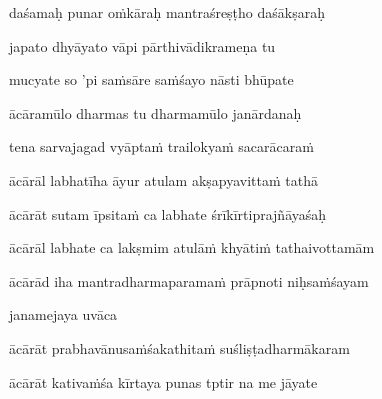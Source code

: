 daśamaḥ punar oṁkāraḥ mantraśreṣṭho daśākṣaraḥ\thinspace{\dandab} \dontdisplaylinenum

japato dhyāyato vāpi pārthivādikrameṇa tu \danda\dontdisplaylinenum

mucyate so 'pi saṁsāre saṁśayo nāsti bhūpate \veg\dontdisplaylinenum



ācāramūlo dharmas tu dharmamūlo janārdanaḥ\thinspace{\dandab} \dontdisplaylinenum

tena sarvajagad vyāptaṁ trailokyaṁ sacarācaraṁ \veg\dontdisplaylinenum

\ujvers\nemsloka 
ācārāl labhatīha āyur atulam akṣapyavittaṁ tathā
\dontdisplaylinenum

\nemslokab 
ācārāt sutam īpsitaṁ ca labhate śrīkīrtiprajñāyaśaḥ \danda\dontdisplaylinenum

\nemslokac 
ācārāl labhate ca lakṣmim atulāṁ khyātiṁ tathaivottamām
\dontdisplaylinenum

\nemslokad 
ācārād iha mantradharmaparamaṁ prāpnoti niḥsaṁśayam \veg\dontdisplaylinenum

\vers
{}

janamejaya uvāca~{\dandab}\dontdisplaylinenum 

\nemsloka 
ācārāt prabhavānusaṁśakathitaṁ suśliṣṭadharmākaram
\dontdisplaylinenum

\nemslokab 
ācārāt kativaṁśa kīrtaya punas tptir na me jāyate \danda\dontdisplaylinenum

